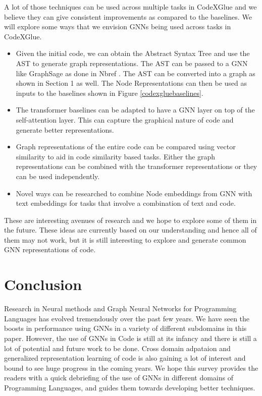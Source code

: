 \documentclass{article}
\begin{document}
A lot of those techniques can be used across multiple tasks in CodeXGlue and we believe they can give consistent improvements as compared to the baselines. We will explore some ways that we envision GNNs being used across tasks in CodeXGlue.

\begin{itemize}
    \item Given the initial code, we can obtain the Abstract Syntax Tree and use the AST to generate graph representations. The AST can be passed to a GNN like GraphSage \cite{hamilton2017inductive} as done in Nbref \cite{nbref}. The AST can be converted into a graph as shown in Section 1 as well. The Node Representations can then be used as inputs to the baselines shown in Figure \ref{codexgluebaselines}.
    \item The transformer baselines can be adapted to have a GNN layer on top of the self-attention layer. This can capture the graphical nature of code and generate better representations.
    \item Graph representations of the entire code can be compared using vector similarity to aid in code similarity based tasks. Either the graph representations can be combined with the transformer representations or they can be used independently.
    \item Novel ways can be researched to combine Node embeddings from GNN with text embeddings for tasks that involve a combination of text and code.
\end{itemize}

These are interesting avenues of research and we hope to explore some of them in the future. These ideas are currently based on our understanding and hence all of them may not work, but it is still interesting to explore and generate common GNN representations of code.

\section{Conclusion}
Research in Neural methods and Graph Neural Networks for Programming Languages has evolved tremendously over the past few years. We have seen the boosts in performance using GNNs in a variety of different subdomains in this paper. However, the use of GNNs in Code is still at its infancy and there is still a lot of potential and future work to be done. Cross domain adpataion and generalized representation learning of code is also gaining a lot of interest and bound to see huge progress in the coming years. We hope this survey provides the readers with a quick debriefing of the use of GNNs in different domains of Programming Languages, and guides them towards developing better techniques.



\end{document}
